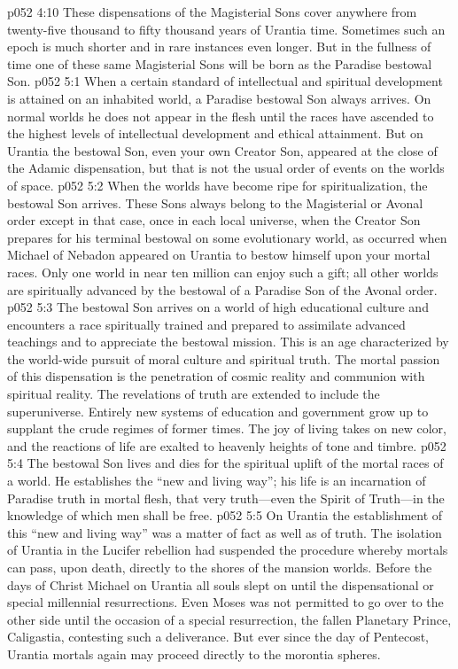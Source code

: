 \pc \vs p052 4:10 These dispensations of the Magisterial Sons cover anywhere from twenty\hyp{}five thousand to fifty thousand years of Urantia time. Sometimes such an epoch is much shorter and in rare instances even longer. But in the fullness of time one of these same Magisterial Sons will be born as the Paradise bestowal Son.
\vs p052 5:1 When a certain standard of intellectual and spiritual development is attained on an inhabited world, a Paradise bestowal Son always arrives. On normal worlds he does not appear in the flesh until the races have ascended to the highest levels of intellectual development and ethical attainment. But on Urantia the bestowal Son, even your own Creator Son, appeared at the close of the Adamic dispensation, but that is not the usual order of events on the worlds of space.
\vs p052 5:2 When the worlds have become ripe for spiritualization, the bestowal Son arrives. These Sons always belong to the Magisterial or Avonal order except in that case, once in each local universe, when the Creator Son prepares for his terminal bestowal on some evolutionary world, as occurred when Michael of Nebadon appeared on Urantia to bestow himself upon your mortal races. Only one world in near ten million can enjoy such a gift; all other worlds are spiritually advanced by the bestowal of a Paradise Son of the Avonal order.
\pc \vs p052 5:3 The bestowal Son arrives on a world of high educational culture and encounters a race spiritually trained and prepared to assimilate advanced teachings and to appreciate the bestowal mission. This is an age characterized by the world\hyp{}wide pursuit of moral culture and spiritual truth. The mortal passion of this dispensation is the penetration of cosmic reality and communion with spiritual reality. The revelations of truth are extended to include the superuniverse. Entirely new systems of education and government grow up to supplant the crude regimes of former times. The joy of living takes on new color, and the reactions of life are exalted to heavenly heights of tone and timbre.
\vs p052 5:4 The bestowal Son lives and dies for the spiritual uplift of the mortal races of a world. He establishes the “new and living way”; his life is an incarnation of Paradise truth in mortal flesh, that very truth---even the Spirit of Truth---in the knowledge of which men shall be free.
\vs p052 5:5 On Urantia the establishment of this “new and living way” was a matter of fact as well as of truth. The isolation of Urantia in the Lucifer rebellion had suspended the procedure whereby mortals can pass, upon death, directly to the shores of the mansion worlds. Before the days of Christ Michael on Urantia all souls slept on until the dispensational or special millennial resurrections. Even Moses was not permitted to go over to the other side until the occasion of a special resurrection, the fallen Planetary Prince, Caligastia, contesting such a deliverance. But ever since the day of Pentecost, Urantia mortals again may proceed directly to the morontia spheres.
